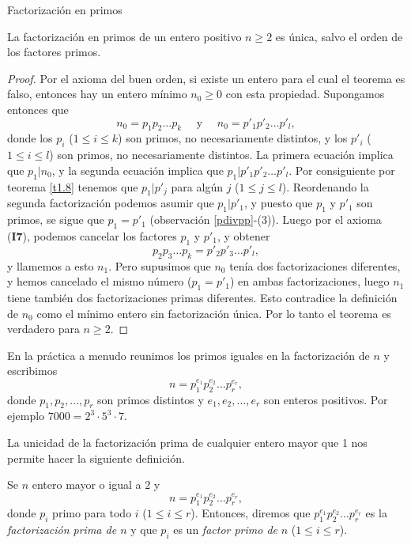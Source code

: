 \begin{section}{Factorización en primos}
\begin{teorema}\label{t1.8.2} La factorización en primos de un entero positivo $n\ge 2$ es única, salvo el orden de los factores primos.
\end{teorema}
\begin{proof} Por el axioma del buen orden, si existe un entero para el cual el teorema es falso, entonces hay un entero mínimo $n_0\ge 0$ con esta propiedad. Supongamos entonces que 
$$
n_0= p_1p_2\ldots p_k\quad\text{ y }\quad n_0= p'_1p'_2\ldots p'_l,
$$
donde los $p_i$ ($1\le i \le k$) son primos, no necesariamente distintos, y los $p'_i$ ($1\le i \le l$) son primos, no necesariamente distintos. La primera ecuación implica que $p_1|n_0$, y la segunda ecuación implica que $p_1 | p'_1p'_2\ldots p'_l$. Por consiguiente por teorema \ref{t1.8} tenemos que $p_1|p'_j$ para algún $j$ ($1\le j \le l$). Reordenando la segunda factorización podemos asumir que $p_1 | p'_1$, y puesto que $p_1$ y $p'_1$ son primos, se sigue que $p_1=p'_1$ (observación \ref{pdivpp}-(3)). Luego por el axioma (\textbf{I7}), podemos cancelar los factores $p_1$ y $p'_1$, y obtener
$$
p_2p_3 \ldots p_k = p'_2p'_3 \ldots p'_l,
$$
y llamemos a esto $n_1$. Pero supusimos que $n_0$ tenía dos factorizaciones diferentes, y hemos cancelado el mismo número ($p_1=p'_1$) en ambas factorizaciones, luego $n_1$ tiene también dos factorizaciones primas diferentes. Esto contradice la definición de $n_0$ como el mínimo entero sin factorización única. Por lo tanto el teorema es verdadero para $n\ge 2$.
\end{proof}

En la práctica a menudo reunimos los primos iguales en la factorización de $n$ y escribimos
\begin{equation*}
n=p_1^{e_1}p_2^{e_2}\ldots p_r^{e_r},
\end{equation*}
donde $p_1,p_2,\ldots ,p_r$ son primos distintos y $e_1,e_2,\ldots,e_r$ son enteros positivos. Por ejemplo $ 7000 = 2^3 \cdot 5^3 \cdot 7$.

La unicidad de la factorización prima de cualquier entero mayor que 1 nos permite hacer la siguiente definición. 

\begin{definicion}
    Se $n$  entero mayor o igual a $2$ y 
    \begin{equation*}
        n=p_1^{e_1}p_2^{e_2}\ldots p_r^{e_r},
    \end{equation*}
    donde $p_i$ primo para todo $i$ ($1\le i \le r$). Entonces, diremos que  $p_1^{e_1}p_2^{e_2}\ldots p_r^{e_r}$ es la \textit{factorización prima de $n$} y que $p_i$ es un \textit{factor primo de } $n$  ($1\le i \le r$).
\end{definicion}


\end{section}
